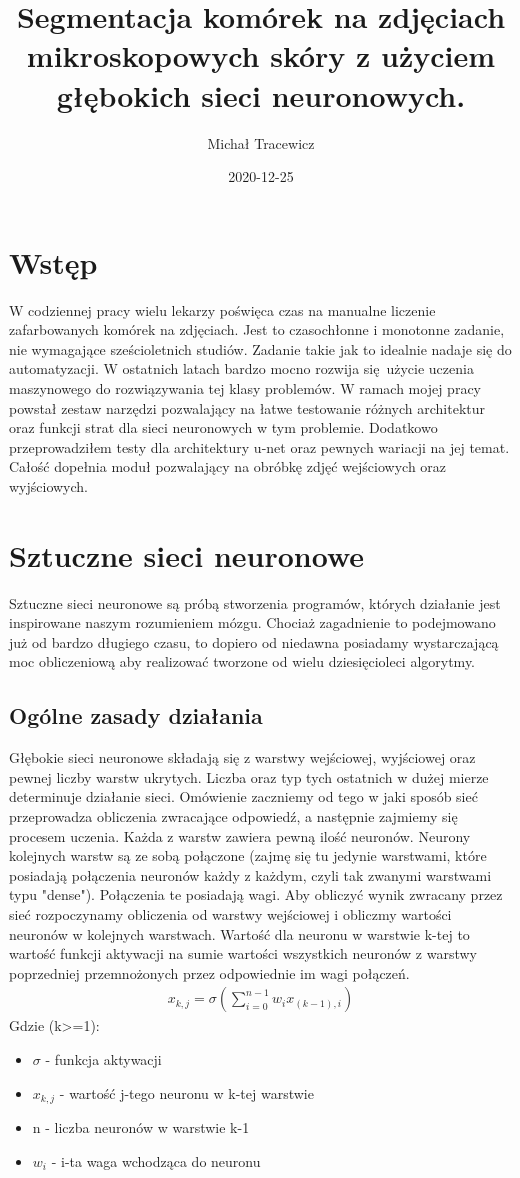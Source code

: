 \documentclass{article}
\title{Segmentacja komórek na zdjęciach mikroskopowych skóry z użyciem głębokich sieci neuronowych.}
\date{2020-12-25}
\author{Michał Tracewicz}
\begin{document}
\maketitle
\newpage
\tableofcontents
\newpage
\section{Wstęp}
W codziennej pracy wielu lekarzy poświęca czas na manualne liczenie zafarbowanych komórek na zdjęciach.
Jest to czasochłonne i monotonne zadanie, nie wymagające sześcioletnich studiów.
Zadanie takie jak to idealnie nadaje się do automatyzacji.
W ostatnich latach bardzo mocno rozwija się użycie uczenia maszynowego do rozwiązywania tej klasy problemów.
W ramach mojej pracy powstał zestaw narzędzi pozwalający na łatwe testowanie różnych architektur oraz funkcji strat dla sieci neuronowych w tym problemie.
Dodatkowo przeprowadziłem testy dla architektury u-net oraz pewnych wariacji na jej temat.
Całość dopełnia moduł pozwalający na obróbkę zdjęć wejściowych oraz wyjściowych.
\newpage
\section{Sztuczne sieci neuronowe}
Sztuczne sieci neuronowe są próbą stworzenia programów, których działanie jest inspirowane naszym rozumieniem mózgu.
Chociaż zagadnienie to podejmowano już od bardzo długiego czasu, to dopiero od niedawna posiadamy wystarczającą moc obliczeniową aby realizować tworzone od wielu dziesięcioleci algorytmy.
\subsection{Ogólne zasady działania}
Głębokie sieci neuronowe składają się z warstwy wejściowej, wyjściowej oraz pewnej liczby warstw ukrytych.
Liczba oraz typ tych ostatnich w dużej mierze determinuje działanie sieci.
Omówienie zaczniemy od tego w jaki sposób sieć przeprowadza obliczenia zwracające odpowiedź, a następnie zajmiemy się procesem uczenia.
Każda z warstw zawiera pewną ilość neuronów.
Neurony kolejnych warstw są ze sobą połączone (zajmę się tu jedynie warstwami, które posiadają połączenia neuronów każdy z każdym, czyli tak zwanymi warstwami typu "dense").
Połączenia te posiadają wagi.
Aby obliczyć wynik zwracany przez sieć rozpoczynamy obliczenia od warstwy wejściowej i obliczmy wartości neuronów w kolejnych warstwach.
Wartość dla neuronu w warstwie k-tej to wartość funkcji aktywacji na sumie wartości wszystkich neuronów z warstwy poprzedniej przemnożonych przez odpowiednie im wagi połączeń.
\begin{align*}
  x_{k,j} = \sigma(\sum\limits_{i=0}^{n-1}{w_ix_{(k-1),i}})
\end{align*}
Gdzie (k>=1):
\begin{itemize}
  \item $\sigma$ - funkcja aktywacji
  \item $x_{k,j}$ - wartość j-tego neuronu w k-tej warstwie
  \item n - liczba neuronów w warstwie k-1
  \item $w_i$ - i-ta waga wchodząca do neuronu
\end{itemize}
\end{document}
